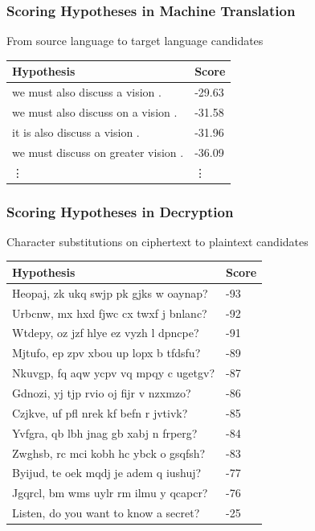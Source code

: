 \begin{frame}[fragile]
\frametitle{Scoring Hypotheses in Machine Translation}
\centering
\begin{block}{From source language to target language candidates}
\begin{tabular}{ll}
\rowcolor{MidnightBlue!50}
Hypothesis & Score \\
\hline
we must also discuss a vision . & -29.63 \\
we must also discuss on a vision . & -31.58 \\
it is also discuss a vision . & -31.96 \\
we must discuss on greater vision . & -36.09 \\
\vdots & \vdots \\
\end{tabular}
\end{block}
\end{frame}

\begin{frame}
\frametitle{Scoring Hypotheses in Decryption}
\centering
\begin{block}{Character substitutions on ciphertext to plaintext candidates}
\begin{tabular}{ll}
\rowcolor{MidnightBlue!50}
Hypothesis & Score \\
\hline
Heopaj, zk ukq swjp pk gjks w oaynap? & -93\\
Urbcnw, mx hxd fjwc cx twxf j bnlanc? & -92\\
Wtdepy, oz jzf hlye ez vyzh l dpncpe? & -91\\
Mjtufo, ep zpv xbou up lopx b tfdsfu? & -89\\
Nkuvgp, fq aqw ycpv vq mpqy c ugetgv? & -87\\
Gdnozi, yj tjp rvio oj fijr v nzxmzo? & -86\\
Czjkve, uf pfl nrek kf befn r jvtivk? & -85\\
Yvfgra, qb lbh jnag gb xabj n frperg? & -84\\
Zwghsb, rc mci kobh hc ybck o gsqfsh? & -83\\
Byijud, te oek mqdj je adem q iushuj? & -77\\
Jgqrcl, bm wms uylr rm ilmu y qcapcr? & -76\\
Listen, do you want to know a secret? & -25\\
\end{tabular}
\end{block}
\end{frame}

